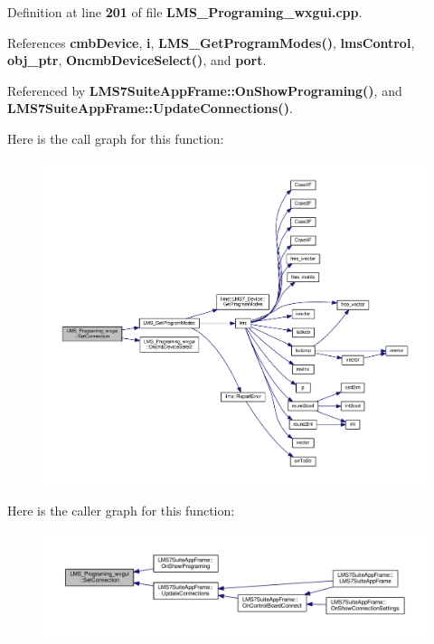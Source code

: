 Definition at line {\bf 201} of file {\bf L\+M\+S\+\_\+\+Programing\+\_\+wxgui.\+cpp}.



References {\bf cmb\+Device}, {\bf i}, {\bf L\+M\+S\+\_\+\+Get\+Program\+Modes()}, {\bf lms\+Control}, {\bf obj\+\_\+ptr}, {\bf Oncmb\+Device\+Select()}, and {\bf port}.



Referenced by {\bf L\+M\+S7\+Suite\+App\+Frame\+::\+On\+Show\+Programing()}, and {\bf L\+M\+S7\+Suite\+App\+Frame\+::\+Update\+Connections()}.



Here is the call graph for this function\+:
\nopagebreak
\begin{figure}[H]
\begin{center}
\leavevmode
\includegraphics[width=350pt]{db/d33/classLMS__Programing__wxgui_ab57b7eef0ed213db50d9d122e0d74227_cgraph}
\end{center}
\end{figure}




Here is the caller graph for this function\+:
\nopagebreak
\begin{figure}[H]
\begin{center}
\leavevmode
\includegraphics[width=350pt]{db/d33/classLMS__Programing__wxgui_ab57b7eef0ed213db50d9d122e0d74227_icgraph}
\end{center}
\end{figure}


